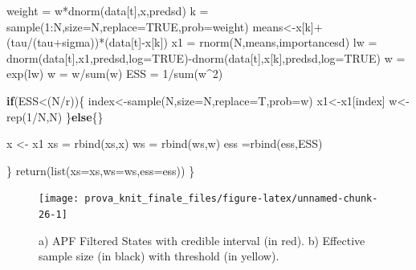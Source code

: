 \documentclass[
]{book}
\newenvironment{Shaded}{\begin{snugshade}}{\end{snugshade}}
\newcommand{\AttributeTok}[1]{\textcolor[rgb]{0.77,0.63,0.00}{#1}}
\newcommand{\ConstantTok}[1]{\textcolor[rgb]{0.00,0.00,0.00}{#1}}
\newcommand{\ControlFlowTok}[1]{\textcolor[rgb]{0.13,0.29,0.53}{\textbf{#1}}}
\newcommand{\DecValTok}[1]{\textcolor[rgb]{0.00,0.00,0.81}{#1}}
\newcommand{\FunctionTok}[1]{\textcolor[rgb]{0.00,0.00,0.00}{#1}}
\newcommand{\NormalTok}[1]{#1}
\newcommand{\OtherTok}[1]{\textcolor[rgb]{0.56,0.35,0.01}{#1}}
\newcommand{\SpecialCharTok}[1]{\textcolor[rgb]{0.00,0.00,0.00}{#1}}
\theoremstyle{break}
\theoremstyle{nonumberplain}
\begin{document}
\begin{Shaded}
\begin{Highlighting}[]
\NormalTok{    weight }\OtherTok{=}\NormalTok{ w}\SpecialCharTok{*}\FunctionTok{dnorm}\NormalTok{(data[t],x,predsd)}
\NormalTok{    k   }\OtherTok{=} \FunctionTok{sample}\NormalTok{(}\DecValTok{1}\SpecialCharTok{:}\NormalTok{N,}\AttributeTok{size=}\NormalTok{N,}\AttributeTok{replace=}\ConstantTok{TRUE}\NormalTok{,}\AttributeTok{prob=}\NormalTok{weight)}
\NormalTok{    means}\OtherTok{\textless{}{-}}\NormalTok{x[k]}\SpecialCharTok{+}\NormalTok{(tau}\SpecialCharTok{/}\NormalTok{(tau}\SpecialCharTok{+}\NormalTok{sigma))}\SpecialCharTok{*}\NormalTok{(data[t]}\SpecialCharTok{{-}}\NormalTok{x[k])}
\NormalTok{    x1   }\OtherTok{=} \FunctionTok{rnorm}\NormalTok{(N,means,importancesd)}
\NormalTok{    lw  }\OtherTok{=} \FunctionTok{dnorm}\NormalTok{(data[t],x1,predsd,}\AttributeTok{log=}\ConstantTok{TRUE}\NormalTok{)}\SpecialCharTok{{-}}\FunctionTok{dnorm}\NormalTok{(data[t],x[k],predsd,}\AttributeTok{log=}\ConstantTok{TRUE}\NormalTok{)}
\NormalTok{    w   }\OtherTok{=} \FunctionTok{exp}\NormalTok{(lw)}
\NormalTok{    w   }\OtherTok{=}\NormalTok{ w}\SpecialCharTok{/}\FunctionTok{sum}\NormalTok{(w)}
\NormalTok{    ESS  }\OtherTok{=} \DecValTok{1}\SpecialCharTok{/}\FunctionTok{sum}\NormalTok{(w}\SpecialCharTok{\^{}}\DecValTok{2}\NormalTok{)}
    
    \ControlFlowTok{if}\NormalTok{(ESS}\SpecialCharTok{\textless{}}\NormalTok{(N}\SpecialCharTok{/}\NormalTok{r))\{}
\NormalTok{      index}\OtherTok{\textless{}{-}}\FunctionTok{sample}\NormalTok{(N,}\AttributeTok{size=}\NormalTok{N,}\AttributeTok{replace=}\NormalTok{T,}\AttributeTok{prob=}\NormalTok{w)}
\NormalTok{      x1}\OtherTok{\textless{}{-}}\NormalTok{x1[index]}
\NormalTok{      w}\OtherTok{\textless{}{-}}\FunctionTok{rep}\NormalTok{(}\DecValTok{1}\SpecialCharTok{/}\NormalTok{N,N)}
\NormalTok{    \}}\ControlFlowTok{else}\NormalTok{\{\}}
    
\NormalTok{    x }\OtherTok{\textless{}{-}}\NormalTok{ x1}
\NormalTok{    xs }\OtherTok{=} \FunctionTok{rbind}\NormalTok{(xs,x)}
\NormalTok{    ws }\OtherTok{=} \FunctionTok{rbind}\NormalTok{(ws,w)}
\NormalTok{    ess }\OtherTok{=}\FunctionTok{rbind}\NormalTok{(ess,ESS)}

\NormalTok{  \}}
  \FunctionTok{return}\NormalTok{(}\FunctionTok{list}\NormalTok{(}\AttributeTok{xs=}\NormalTok{xs,}\AttributeTok{ws=}\NormalTok{ws,}\AttributeTok{ess=}\NormalTok{ess))}
\NormalTok{\}}
\end{Highlighting}
\end{Shaded}

\begin{figure}[H]

{\centering \texttt{[image: prova\_knit\_finale\_files/figure-latex/unnamed-chunk-26-1]} 

}

\caption{a) APF Filtered States with credible interval (in red). b) Effective sample size (in black) with threshold (in yellow).}\label{fig:unnamed-chunk-26}
\end{figure}
\end{document}
